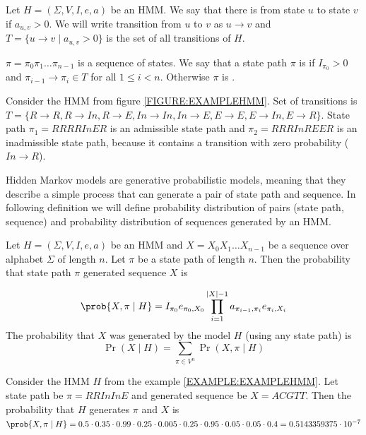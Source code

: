 \begin{definition}\label{DEF:STATEPATH}
Let $H=(\Sigma,V,I,e,a)$ be an HMM. We say that there is 
from state $u$ to state $v$ if $a_{u,v}>0$. We will write transition from $u$ to
$v$ as $u\to v$ and $T=\{u\to v\mid a_{u,v}>0\}$ is the set of all transitions of
$H$.

 $\pi=\pi_0\pi_1\dots\pi_{n-1}$ is a sequence of
states. We say that a state path $\pi$ is  if $I_{\pi_0}>0$
and  $\pi_{i-1}\to\pi_i\in T$ for all $1\leq i < n$. Otherwise $\pi$ is
.
\end{definition}

\begin{example}
Consider the HMM from figure \ref{FIGURE:EXAMPLEHMM}. Set of transitions is
$T=\{R\to R,R\to In, R\to E,In\to In, In\to E, E\to E, E\to In, E\to R\}$.
State path $\pi_1=RRRRInER$ is an admissible state path and $\pi_2=RRRInREER$
is an inadmissible state path, because it contains a transition with zero
probability ($In\to R$).
\end{example}

Hidden Markov models are generative probabilistic models, meaning that they
describe a simple process that can generate a pair of state path and sequence.
In following definition we will define probability distribution of pairs (state
path, sequence) and probability distribution of sequences generated by an HMM.

\begin{definition}
Let $H=(\Sigma,V,I,e,a)$ be an HMM and $X=X_0X_1\dots X_{n-1}$ be a sequence over
alphabet $\Sigma$ of length $n$. Let $\pi$ be a state path of length $n$. Then the
probability that state path $\pi$ generated sequence $X$ is 

\[\prob{X,\pi\mid H}=
I_{\pi_0}e_{\pi_0,X_0}\prod_{i=1}^{|X|-1}a_{\pi_{i-1},\pi_i}e_{\pi_i,X_i}\]
The probability that $X$ was generated by the
model $H$ (using any state path) is 
\[\Pr\left(X\mid H\right)=\sum_{\pi\in V^n}\Pr\left(X,\pi\mid H\right)\]

\end{definition}

\begin{example}
Consider the HMM $H$ from the example \ref{EXAMPLE:EXAMPLEHMM}. Let state path be $\pi=RRInInE$ and
generated sequence be $X=ACGTT$. Then the probability that $H$ generates $\pi$
and $X$ is 
$\prob{ X,\pi\mid H } = 0.5 \cdot 0.35 \cdot 0.99 \cdot 0.25 \cdot 0.005 \cdot 0.25 \cdot 0.95 \cdot 0.05 \cdot 0.05 \cdot 0.4 =
0.5143359375  \cdot  10^{-7}$
\end{example}




